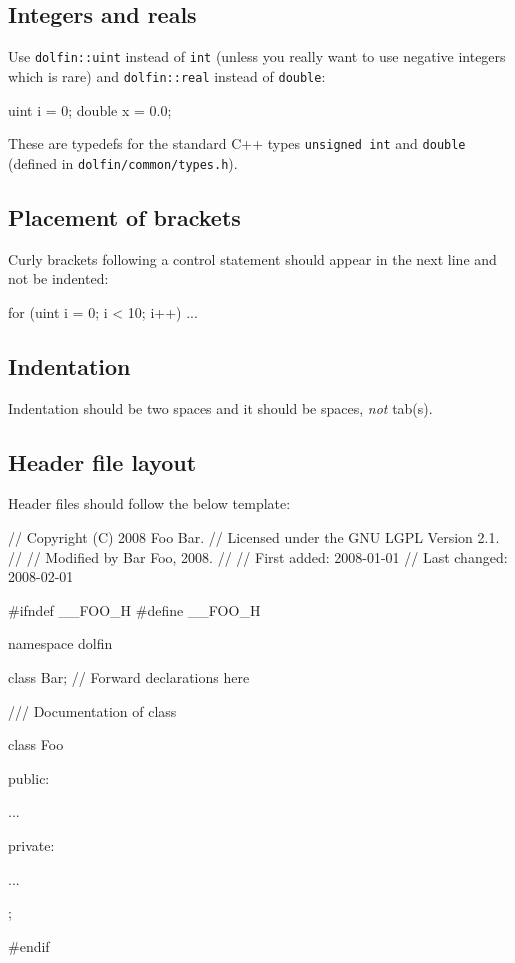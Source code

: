 \subsection{Integers and reals}

Use \texttt{dolfin::uint} instead of \texttt{int} (unless you really
want to use negative integers which is rare) and \texttt{dolfin::real}
instead of \texttt{double}:
\begin{code}
uint i = 0;
double x = 0.0;
\end{code}
These are typedefs for the standard C++ types \texttt{unsigned int}
and \texttt{double} (defined in \texttt{dolfin/common/types.h}).

\subsection{Placement of brackets}

Curly brackets following a control statement should appear in the next
line and not be indented:
\begin{code}
for (uint i = 0; i < 10; i++)
{
  ...
}
\end{code}

\subsection{Indentation}

Indentation should be two spaces and it should be spaces, \emph{not}
tab(s).

\subsection{Header file layout}

Header files should follow the below template:
\vspace{-0.5cm}
\begin{code}
// Copyright (C) 2008 Foo Bar.
// Licensed under the GNU LGPL Version 2.1.
//
// Modified by Bar Foo, 2008.
//
// First added:  2008-01-01
// Last changed: 2008-02-01

#ifndef __FOO_H
#define __FOO_H

namespace dolfin
{

  class Bar; // Forward declarations here

  /// Documentation of class

  class Foo
  {
  public:

    ...

  private:

    ...

  };

}

#endif
\end{code}

